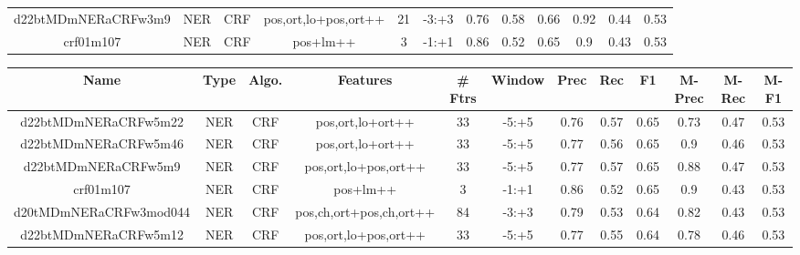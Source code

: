 \documentclass[a4paper]{article}
\begin{document}
\begin{landscape}
\begin{center}
\begin{tabular}{ |c|c|c|c|c|c|c|c|c|c|c|c|}
 
 	
 	\small{ d22btMDmNERaCRFw3m9 } & \small{ NER} & \small{  CRF }  & pos,ort,lo+pos,ort++  &  21 &  \small{  -3:+3 }  &  0.76 & 0.58 & 0.66  &  0.92 & 0.44 & 0.53 \\
 	

 
 	
 	\small{ crf01m107 } & \small{ NER} & \small{  CRF }  & pos+lm++  &  3 &  \small{  -1:+1 }  &  0.86 & 0.52 & 0.65  &  0.9 & 0.43 & 0.53 \\
 	
 \hline
\end{tabular}
\end{center}




\begin{center}
\begin{tabular}{ |c|c|c|c|c|c|c|c|c|c|c|c|} 
 \hline
 	Name & Type & Algo. & Features & \# Ftrs & Window & Prec & Rec & F1 & M-Prec & M-Rec & M-F1\\
 \hline

 	

 
 	
 	\small{ d22btMDmNERaCRFw5m22 } & \small{ NER} & \small{  CRF }  & pos,ort,lo+ort++  &  33 &  \small{  -5:+5 }  &  0.76 & 0.57 & 0.65  &  0.73 & 0.47 & 0.53 \\
 	

 
 	
 	\small{ d22btMDmNERaCRFw5m46 } & \small{ NER} & \small{  CRF }  & pos,ort,lo+ort++  &  33 &  \small{  -5:+5 }  &  0.77 & 0.56 & 0.65  &  0.9 & 0.46 & 0.53 \\
 	

 
 	
 	\small{ d22btMDmNERaCRFw5m9 } & \small{ NER} & \small{  CRF }  & pos,ort,lo+pos,ort++  &  33 &  \small{  -5:+5 }  &  0.77 & 0.57 & 0.65  &  0.88 & 0.47 & 0.53 \\
 	

 
 	
 	\small{ crf01m107 } & \small{ NER} & \small{  CRF }  & pos+lm++  &  3 &  \small{  -1:+1 }  &  0.86 & 0.52 & 0.65  &  0.9 & 0.43 & 0.53 \\
 	

 
 	
 	\small{ d20tMDmNERaCRFw3mod044 } & \small{ NER} & \small{  CRF }  & pos,ch,ort+pos,ch,ort++  &  84 &  \small{  -3:+3 }  &  0.79 & 0.53 & 0.64  &  0.82 & 0.43 & 0.53 \\
 	

 
 	
 	\small{ d22btMDmNERaCRFw5m12 } & \small{ NER} & \small{  CRF }  & pos,ort,lo+pos,ort++  &  33 &  \small{  -5:+5 }  &  0.77 & 0.55 & 0.64  &  0.78 & 0.46 & 0.53 \\
 	


\end{tabular}
\end{center}
\end{landscape}
\end{document}
